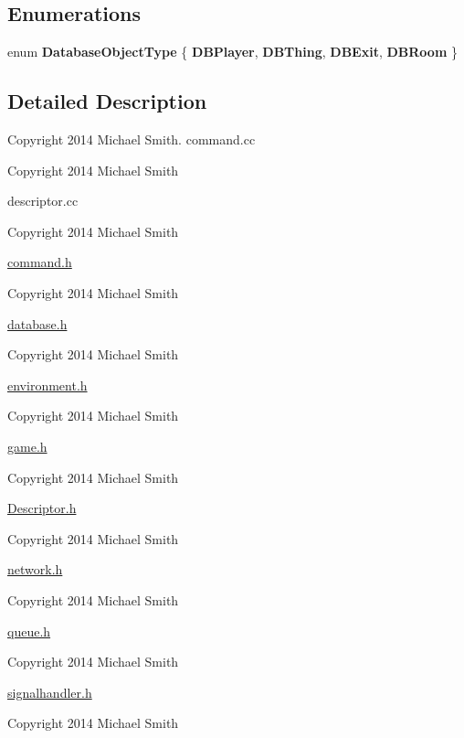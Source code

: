 \subsection*{Enumerations}
\begin{DoxyCompactItemize}
\item 
enum {\bfseries Database\-Object\-Type} \{ {\bfseries D\-B\-Player}, 
{\bfseries D\-B\-Thing}, 
{\bfseries D\-B\-Exit}, 
{\bfseries D\-B\-Room}
 \}
\end{DoxyCompactItemize}


\subsection{Detailed Description}
Copyright 2014 Michael Smith. command.\-cc

Copyright 2014 Michael Smith

descriptor.\-cc

Copyright 2014 Michael Smith

\hyperlink{command_8h_source}{command.\-h}

Copyright 2014 Michael Smith

\hyperlink{database_8h_source}{database.\-h}

Copyright 2014 Michael Smith

\hyperlink{environment_8h_source}{environment.\-h}

Copyright 2014 Michael Smith

\hyperlink{game_8h_source}{game.\-h}

Copyright 2014 Michael Smith

\hyperlink{descriptor_8h_source}{Descriptor.\-h}

Copyright 2014 Michael Smith

\hyperlink{network_8h_source}{network.\-h}

Copyright 2014 Michael Smith

\hyperlink{queue_8h_source}{queue.\-h}

Copyright 2014 Michael Smith

\hyperlink{signalhandler_8h_source}{signalhandler.\-h}

Copyright 2014 Michael Smith 

